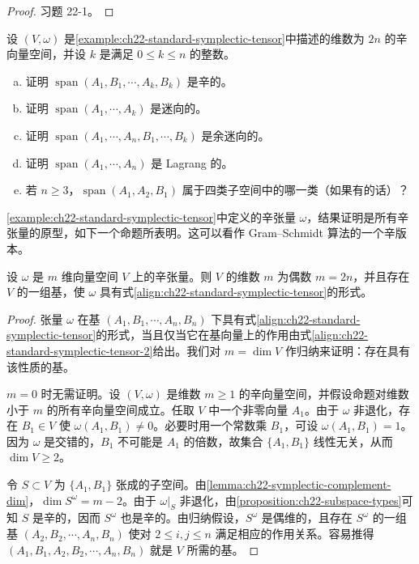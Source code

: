 \documentclass[../../main.tex]{subfiles}
\begin{document}
\begin{proof}
习题 22-1。
\end{proof}

\begin{exercise}\label{exercise:ch22-06}
设 $(V,\omega)$ 是\cref{example:ch22-standard-symplectic-tensor}中描述的维数为 $2n$ 的辛向量空间，并设 $k$ 是满足 $0\leqslant k\leqslant n$ 的整数。
\begin{enumerate}[(a)]
\item 证明 $\operatorname{span}(A_1,B_1,\cdots ,A_k,B_k)$ 是辛的。
\item 证明 $\operatorname{span}(A_1,\cdots ,A_k)$ 是迷向的。
\item 证明 $\operatorname{span}(A_1,\cdots ,A_n,B_1,\cdots ,B_k)$ 是余迷向的。
\item 证明 $\operatorname{span}(A_1,\cdots ,A_n)$ 是 Lagrang 的。
\item 若 $n\geqslant3$，$\operatorname{span}(A_1,A_2,B_1)$ 属于四类子空间中的哪一类（如果有的话）？
\end{enumerate}
\end{exercise}

\cref{example:ch22-standard-symplectic-tensor}中定义的辛张量 $\omega$，结果证明是所有辛张量的原型，如下一个命题所表明。这可以看作 Gram--Schmidt 算法的一个辛版本。

\begin{proposition}[辛张量的典范形式]\label{proposition:ch22-symplectic-canonical-form}
设 $\omega$ 是 $m$ 维向量空间 $V$ 上的辛张量。则 $V$ 的维数 $m$ 为偶数 $m=2n$，并且存在 $V$ 的一组基，使 $\omega$ 具有式\eqref{align:ch22-standard-symplectic-tensor}的形式。
\end{proposition}

\begin{proof}
张量 $\omega$ 在基 $(A_1,B_1,\cdots ,A_n,B_n)$ 下具有式\eqref{align:ch22-standard-symplectic-tensor}的形式，当且仅当它在基向量上的作用由式\eqref{align:ch22-standard-symplectic-tensor-2}给出。我们对 $m=\dim V$ 作归纳来证明：存在具有该性质的基。

$m=0$ 时无需证明。设 $(V,\omega)$ 是维数 $m\geqslant1$ 的辛向量空间，并假设命题对维数小于 $m$ 的所有辛向量空间成立。任取 $V$ 中一个非零向量 $A_1$。由于 $\omega$ 非退化，存在 $B_1\in V$ 使 $\omega(A_1,B_1)\neq0$。必要时用一个常数乘 $B_1$，可设 $\omega(A_1,B_1)=1$。因为 $\omega$ 是交错的，$B_1$ 不可能是 $A_1$ 的倍数，故集合 $\{A_1,B_1\}$ 线性无关，从而 $\dim V\geqslant2$。

令 $S\subset V$ 为 $\{A_1,B_1\}$ 张成的子空间。由\cref{lemma:ch22-symplectic-complement-dim}，$\dim S^\omega=m-2$。由于 $\omega|_S$ 非退化，由\cref{proposition:ch22-subspace-types}可知 $S$ 是辛的，因而 $S^\omega$ 也是辛的。由归纳假设，$S^\omega$ 是偶维的，且存在 $S^\omega$ 的一组基 $(A_2,B_2,\cdots ,A_n,B_n)$ 使对 $2\leqslant i,j\leqslant n$ 满足相应的作用关系。容易推得 $(A_1,B_1,A_2,B_2,\cdots ,A_n,B_n)$ 就是 $V$ 所需的基。
\end{proof}
\end{document}

